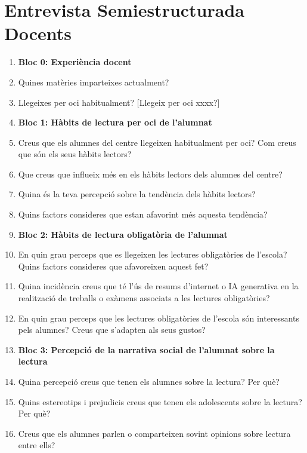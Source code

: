 \documentclass[12pt]{article}
\begin{document}
\section{Entrevista Semiestructurada Docents}
\begin{enumerate}
    \item[] \hspace{-\leftmargin}\textbf{Bloc 0: Experiència docent}
    \item Quines matèries imparteixes actualment?
    \item Llegeixes per oci habitualment? [Llegeix per oci xxxx?]
    \item [] \hspace{-\leftmargin}\textbf{Bloc 1: Hàbits de lectura per oci de l’alumnat}
    \item Creus que els alumnes del centre llegeixen habitualment per oci? Com creus que són els seus hàbits lectors?
    \item Que creus que influeix més en els hàbits lectors dels alumnes del centre?
    \item Quina és la teva percepció sobre la tendència dels hàbits lectors?
    \item Quins factors consideres que estan afavorint més aquesta tendència?
    \item [] \hspace{-\leftmargin}\textbf{Bloc 2: Hàbits de lectura obligatòria de l’alumnat}
    \item En quin grau perceps que es llegeixen les lectures obligatòries de l’escola? Quins factors consideres que afavoreixen aquest fet?
    \item Quina incidència creus que té l’ús de resums d’internet o IA generativa en la realització de treballs o exàmens associats a les lectures obligatòries?
    \item En quin grau perceps que les lectures obligatòries de l’escola són interessants pels alumnes? Creus que s’adapten als seus gustos?
    \item [] \hspace{-\leftmargin}\textbf{Bloc 3: Percepció de la narrativa social de l’alumnat sobre la lectura}
    \item Quina percepció creus que tenen els alumnes sobre la lectura? Per què?
    \item Quins estereotips i prejudicis creus que tenen els adolescents sobre la lectura? Per què?
    \item Creus que els alumnes parlen o comparteixen sovint opinions sobre lectura entre ells?

\end{enumerate}
\end{document}
